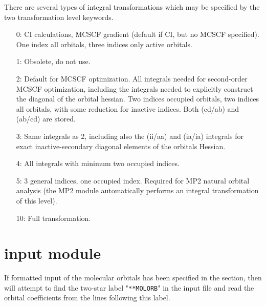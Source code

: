 There are several types of integral transformations which may be
specified by the two transformation level keywords.
\begin{itemize}
   \item[0:] CI calculations, MCSCF gradient (default if CI, but
             no MCSCF specified).
             One index all orbitals, three indices only active
             orbitals.

   \item[1:] Obsolete, do not use.

   \item[2:] Default for MCSCF optimization. All integrals needed for {\sir}
             second-order MCSCF optimization, including the integrals
             needed to explicitly construct the diagonal of the orbital
             hessian. Two indices occupied orbitals, two indices all
             orbitals, with some reduction for inactive indices.
             Both (cd/ab) and (ab/cd) are stored.

   \item[3:] Same integrals as 2, including also the (ii/aa) and
             (ia/ia) integrals for exact inactive-secondary diagonal elements
             of the orbitals Hessian.

   \item[4:] All integrals with minimum two occupied indices.

   \item[5:] 3 general indices, one occupied index.  Required for MP2
             natural orbital analysis (the MP2 module automatically
             performs an integral transformation of this level).

  \item[10:] Full transformation.
\end{itemize}


\pagebreak[3]
\section{\label{sec:ref-molorbinp}  input module}

If formatted input of the molecular orbitals has been specified in
the  section, then {\sir} will attempt to find
the two-star label "\verb|**MOLORB|" in the input file and read
the orbital coefficients from the lines following this label.
